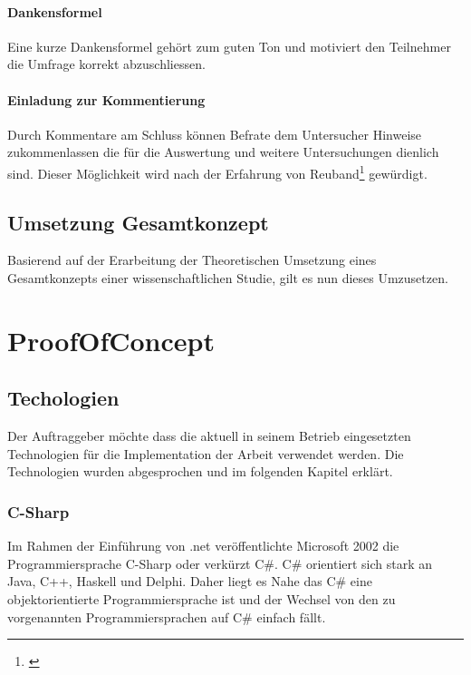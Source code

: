 \subsubsection{Dankensformel}\label{dankensformel}

Eine kurze Dankensformel gehört zum guten Ton und motiviert den
Teilnehmer die Umfrage korrekt abzuschliessen.

\subsubsection{Einladung zur
Kommentierung}\label{einladung-zur-kommentierung}

Durch Kommentare am Schluss können Befrate dem Untersucher Hinweise
zukommenlassen die für die Auswertung und weitere Untersuchungen
dienlich sind. Dieser Möglichkeit wird nach der Erfahrung von
Reuband\footnote{\autocite{kzfss01}} gewürdigt.

\section{Umsetzung Gesamtkonzept}\label{umsetzung-gesamtkonzept}

Basierend auf der Erarbeitung der Theoretischen Umsetzung eines
Gesamtkonzepts einer wissenschaftlichen Studie, gilt es nun dieses
Umzusetzen.

\chapter{ProofOfConcept}\label{proofofconcept}

\section{Techologien}\label{techologien}

Der Auftraggeber möchte dass die aktuell in seinem Betrieb eingesetzten
Technologien für die Implementation der Arbeit verwendet werden. Die
Technologien wurden abgesprochen und im folgenden Kapitel erklärt.

\subsection{C-Sharp}\label{c-sharp}

Im Rahmen der Einführung von .net veröffentlichte Microsoft 2002 die
Programmiersprache C-Sharp oder verkürzt C\#. C\# orientiert sich stark
an Java, C++, Haskell und Delphi. Daher liegt es Nahe das C\# eine
objektorientierte Programmiersprache ist und der Wechsel von den zu
vorgenannten Programmiersprachen auf C\# einfach fällt.

